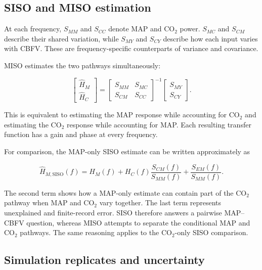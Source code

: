 \documentclass[12pt]{article}
\newcommand{\SISO}{\mathrm{SISO}}
\begin{document}
\subsection{SISO and MISO estimation}

At each frequency, $S_{MM}$ and $S_{CC}$ denote MAP and CO$_2$ power.
$S_{MC}$ and $S_{CM}$ describe their shared variation, while $S_{MY}$ and
$S_{CY}$ describe how each input varies with CBFV. These are frequency-specific
counterparts of variance and covariance.

MISO estimates the two pathways simultaneously:

\begin{equation}
\begin{bmatrix} \widehat H_M \\ \widehat H_C \end{bmatrix}
=
\begin{bmatrix} S_{MM} & S_{MC} \\ S_{CM} & S_{CC} \end{bmatrix}^{-1}
\begin{bmatrix} S_{MY} \\ S_{CY} \end{bmatrix}.
\label{eq:miso}
\end{equation}

This is equivalent to estimating the MAP response while accounting for CO$_2$
and estimating the CO$_2$ response while accounting for MAP. Each resulting
transfer function has a gain and phase at every frequency.

For comparison, the MAP-only SISO estimate can be written approximately as

\begin{equation}
\widehat H_{M,\SISO}(f)
= H_M(f) + H_C(f)\frac{S_{CM}(f)}{S_{MM}(f)}
  + \frac{S_{EM}(f)}{S_{MM}(f)}.
\label{eq:siso_bias}
\end{equation}

The second term shows how a MAP-only estimate can contain part of the CO$_2$
pathway when MAP and CO$_2$ vary together. The last term represents unexplained
and finite-record error. SISO therefore answers a pairwise MAP--CBFV question,
whereas MISO attempts to separate the conditional MAP and CO$_2$ pathways.
The same reasoning applies to the CO$_2$-only SISO comparison.

\subsection{Simulation replicates and uncertainty}
\end{document}
